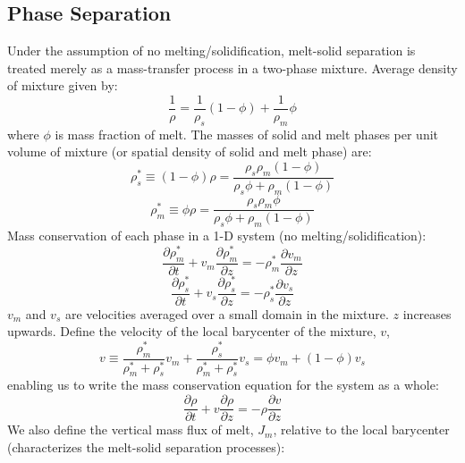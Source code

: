 
\subsection{Phase Separation}
Under the assumption of no melting/solidification, melt-solid separation is treated merely as a mass-transfer process in a two-phase mixture.  Average density of mixture given by:
\begin{equation}
\frac{1}{\rho} = \frac{1}{\rho_s}(1-\phi)+\frac{1}{\rho_m}\phi
\label{eq:abe1993_rho}
\end{equation}
where $\phi$ is mass fraction of melt.
The masses of solid and melt phases per unit volume of mixture (or spatial density of solid and melt phase) are:
\begin{equation}
\rho_s^\ast \equiv (1-\phi) \rho = \frac{\rho_s \rho_m (1-\phi)}{\rho_s \phi + \rho_m(1-\phi)}
\label{eq:abe1993_rhos}
\end{equation}
\begin{equation}
\rho_m^\ast \equiv \phi \rho = \frac{\rho_s \rho_m \phi}{\rho_s \phi + \rho_m(1-\phi)}
\label{eq:abe1993_rhom}
\end{equation}
Mass conservation of each phase in a 1-D system (no melting/solidification):
\begin{equation}
\frac{\partial \rho_m^\ast}{\partial t} + v_m \frac{\partial \rho_m^\ast}{\partial z} = -\rho_m^\ast \frac{\partial v_m}{\partial z}
\end{equation}
\begin{equation}
\frac{\partial \rho_s^\ast}{\partial t} + v_s \frac{\partial \rho_s^\ast}{\partial z} = -\rho_s^\ast \frac{\partial v_s}{\partial z}
\end{equation}
$v_m$ and $v_s$ are velocities averaged over a small domain in the mixture.  $z$ increases upwards.
Define the velocity of the local barycenter of the mixture, $v$, 
\begin{equation}
v \equiv \frac{\rho_m^\ast}{\rho_m^\ast + \rho_s^\ast} v_m + \frac{\rho_s^\ast}{\rho_m^\ast + \rho_s^\ast} v_s = \phi v_m + (1-\phi) v_s
\end{equation}
enabling us to write the mass conservation equation for the system as a whole:
\begin{equation}
\frac{\partial \rho}{\partial t} + v \frac{\partial \rho}{\partial z} = -\rho \frac{\partial v}{\partial z}
\end{equation}
We also define the vertical mass flux of melt, $J_m$, relative to the local barycenter (characterizes the melt-solid separation processes):
